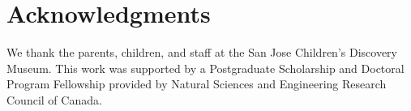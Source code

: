 \documentclass[10pt,letterpaper]{article}
\begin{document}
\section{Acknowledgments}

We thank the parents, children, and staff at the San Jose Children's Discovery Museum. This work was supported by a Postgraduate Scholarship and Doctoral Program Fellowship provided by Natural Sciences and Engineering Research Council of Canada.



\setlength{\bibleftmargin}{.125in}
\setlength{\bibindent}{-\bibleftmargin}


\end{document}
